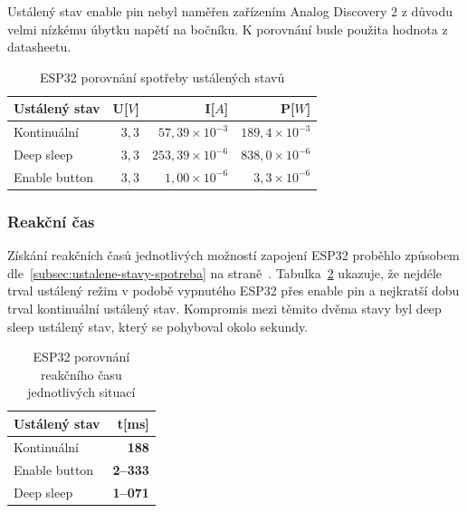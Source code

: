 \documentclass[a4paper, 12pt]{report}
\begin{document}
    Ustálený stav enable pin nebyl naměřen zařízením Analog Discovery 2 z důvodu velmi nízkému úbytku napětí na bočníku. K porovnání bude použita hodnota z datasheetu.
    \begin{table}[h]
        \centering
        \caption{ESP32 porovnání spotřeby ustálených stavů}
        \begin{tabular}{||l|r r r||}
            \hline
            Ustálený stav & U[$V$] & I[$A$]                  & P[$W$]                 \\
            \hline
            Kontinuální   & $3,3$  & $57,39 \times 10^{-3}$  & $189,4 \times 10^{-3}$ \\
            Deep sleep    & $3,3$  & $253,39 \times 10^{-6}$ & $838,0 \times 10^{-6}$ \\
            Enable button & $3,3$  & $1,00\times 10^{-6}$    & $3,3\times 10^{-6}$    \\
            \hline
        \end{tabular}
        \label{tab:esp32-klidove-rezimy-spotreba}
    \end{table}

    \subsubsection{Reakční čas}
    Získání reakčních časů jednotlivých možností zapojení ESP32 proběhlo způsobem dle~\ref{subsec:ustalene-stavy-spotreba} na straně~\pageref{subsec:ustalene-stavy-spotreba}. Tabulka~\ref{tab:esp32-klidove-rezimy-cas} ukazuje, že nejdéle trval ustálený režim v podobě vypnutého ESP32 přes enable pin a nejkratší dobu trval kontinuální ustálený stav. Kompromis mezi těmito dvěma stavy byl deep sleep ustálený stav, který se pohyboval okolo sekundy.

    \begin{table}[h]
        \centering
        \caption{ESP32 porovnání reakčního času jednotlivých situací}
        \begin{tabular}{||l|r||}
            \hline
            Ustálený stav & t[ms]           \\
            \hline
            Kontinuální   & \textbf{188}    \\
            Enable button & \textbf{2--333} \\
            Deep sleep    & \textbf{1--071} \\
            \hline
        \end{tabular}
        \label{tab:esp32-klidove-rezimy-cas}
    \end{table}
\end{document}
